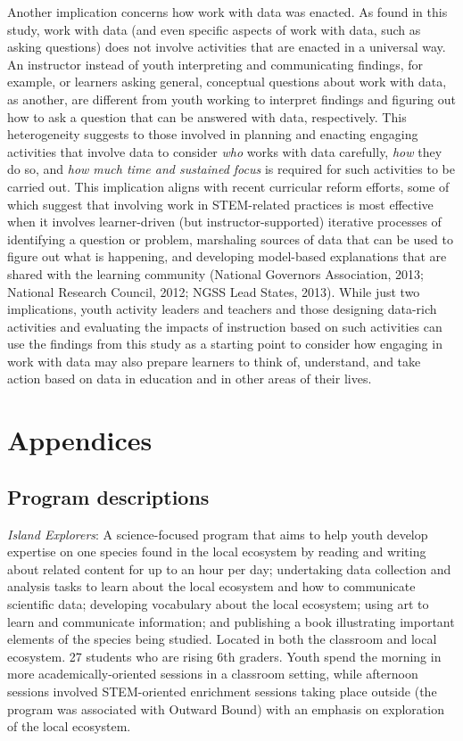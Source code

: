 \documentclass[]{book}
\theoremstyle{definition}
\theoremstyle{definition}
\theoremstyle{definition}
\theoremstyle{remark}
\begin{document}
Another implication concerns how work with data was enacted. As found in
this study, work with data (and even specific aspects of work with data,
such as asking questions) does not involve activities that are enacted
in a universal way. An instructor instead of youth interpreting and
communicating findings, for example, or learners asking general,
conceptual questions about work with data, as another, are different
from youth working to interpret findings and figuring out how to ask a
question that can be answered with data, respectively. This
heterogeneity suggests to those involved in planning and enacting
engaging activities that involve data to consider \emph{who} works with
data carefully, \emph{how} they do so, and \emph{how much time and
sustained focus} is required for such activities to be carried out. This
implication aligns with recent curricular reform efforts, some of which
suggest that involving work in STEM-related practices is most effective
when it involves learner-driven (but instructor-supported) iterative
processes of identifying a question or problem, marshaling sources of
data that can be used to figure out what is happening, and developing
model-based explanations that are shared with the learning community
(National Governors Association, 2013; National Research Council, 2012;
NGSS Lead States, 2013). While just two implications, youth activity
leaders and teachers and those designing data-rich activities and
evaluating the impacts of instruction based on such activities can use
the findings from this study as a starting point to consider how
engaging in work with data may also prepare learners to think of,
understand, and take action based on data in education and in other
areas of their lives.

\chapter{Appendices}\label{appendices}

\section{Program descriptions}\label{program-descriptions}

\emph{Island Explorers}: A science-focused program that aims to help
youth develop expertise on one species found in the local ecosystem by
reading and writing about related content for up to an hour per day;
undertaking data collection and analysis tasks to learn about the local
ecosystem and how to communicate scientific data; developing vocabulary
about the local ecosystem; using art to learn and communicate
information; and publishing a book illustrating important elements of
the species being studied. Located in both the classroom and local
ecosystem. 27 students who are rising 6th graders. Youth spend the
morning in more academically-oriented sessions in a classroom setting,
while afternoon sessions involved STEM-oriented enrichment sessions
taking place outside (the program was associated with Outward Bound)
with an emphasis on exploration of the local ecosystem.
\end{document}
